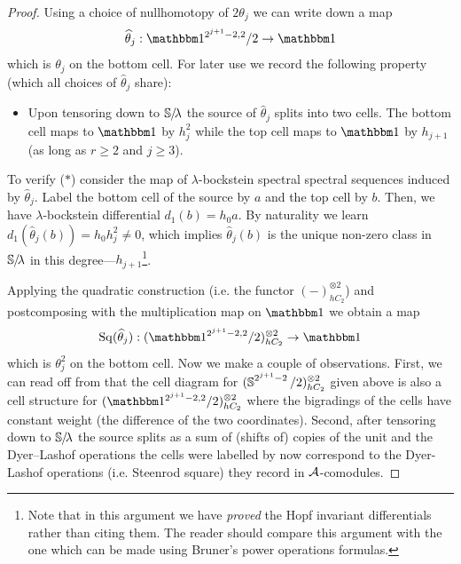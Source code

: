 \begin{proof}      
  Using a choice of nullhomotopy of $2\theta_j$ we can write down a map
  \[ \widehat{\theta}_j : \o^{2^{j+1}-2,2}/2 \to \o \]
  which is $\theta_j$ on the bottom cell.
  For later use we record the following property (which all choices of $\widehat{\theta}_j$ share):
  \begin{itemize}
  \item[($*$)] Upon tensoring down to $\operatorname{\mathbb{S}}\hspace{-2.2pt}/\!\lambda$ the source of $\widehat{\theta}_j$ splits into two cells.
    The bottom cell maps to $\o$ by $h_j^2$ while the top cell maps to $\o$ by $h_{j+1}$ (as long as $r \geq 2$ and $j \geq 3$).
  \end{itemize}
  To verify ($*$) consider the map of $\lambda$-bockstein spectral spectral sequences induced by $\widehat{\theta}_j$. Label the bottom cell of the source by $a$ and the top cell by $b$. Then, we have $\lambda$-bockstein differential $d_1(b) = h_0 a$. By naturality we learn $d_1(\widehat{\theta}_j(b)) = h_0h_j^2 \neq 0$, which implies $\widehat{\theta}_j(b)$ is the unique non-zero class in $\operatorname{\mathbb{S}}\hspace{-2.2pt}/\!\lambda$ in this degree---$h_{j+1}$\footnote{Note that in this argument we have \emph{proved} the Hopf invariant differentials rather than citing them. The reader should compare this argument with the one which can be made using Bruner's power operations formulas.}.
    
  Applying the quadratic construction (i.e. the functor $(-)^{\otimes 2}_{hC_2}$)
  and postcomposing with the multiplication map on $\o$
  we obtain a map
  \[ \mathrm{Sq}(\widehat{\theta}_j) : (\o^{2^{j+1}-2,2}/2)^{\otimes 2}_{hC_2} \to \o \]
  which is $\theta_j^2$ on the bottom cell.
  Now we make a couple of observations.
  First, we can read off from  that the cell diagram for $(\operatorname{\mathbb{S}}^{2^{j+1} -2}/2)^{\otimes 2}_{hC_2}$ given above is also a cell structure for $(\o^{2^{j+1}-2,2}/2)^{\otimes 2}_{hC_2}$ where the bigradings of the cells have constant weight (the difference of the two coordinates).
  Second, after tensoring down to $\operatorname{\mathbb{S}}\hspace{-2.2pt}/\!\lambda$ the source splits as a sum of (shifts of) copies of the unit and the Dyer--Lashof operations the cells were labelled by now correspond to the Dyer-Lashof operations (i.e. Steenrod square) they record in $\operatorname{\mathcal{A}}$-comodules.
  

\end{proof}
